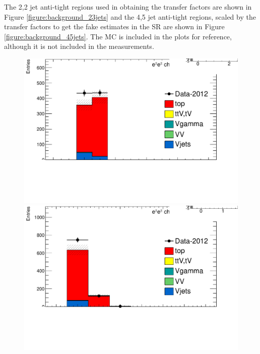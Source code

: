 The 2,2 jet anti-tight regions used in obtaining the transfer factors are shown in Figure \ref{figure:background_23jets} and the 4,5 jet
anti-tight regions, scaled by the transfer factors to get the fake estimates in the SR are shown in Figure \ref{figure:background_45jets}. 
The \ttbar MC is included in the plots for reference, although it is not included in the measurements. 

\begin{figure}[htbp]

  \begin{minipage}[h]{0.5\textwidth}
    \centering \includegraphics[width=\textwidth]{figs/fake/TaT-23jets-1b_nj_ee}
  \end{minipage}\hfill
  \begin{minipage}[h]{0.5\textwidth}
    \centering \includegraphics[width=\textwidth]{figs/fake/TaT-23jets-1b_nb_ee}

\end{minipage}
\end{figure}
